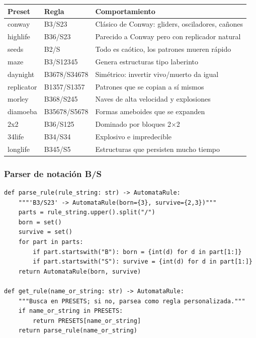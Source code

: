 \documentclass[12pt,a4paper]{article}
\begin{document}
\begin{table}[h]
\centering
\small
\begin{tabular}{llp{6cm}}
\toprule
\textbf{Preset} & \textbf{Regla} & \textbf{Comportamiento} \\
\midrule
conway     & B3/S23      & Clásico de Conway: gliders, osciladores, cañones \\
highlife   & B36/S23     & Parecido a Conway pero con replicador natural \\
seeds      & B2/S        & Todo es caótico, los patrones mueren rápido \\
maze       & B3/S12345   & Genera estructuras tipo laberinto \\
daynight   & B3678/S34678& Simétrico: invertir vivo/muerto da igual \\
replicator & B1357/S1357 & Patrones que se copian a sí mismos \\
morley     & B368/S245   & Naves de alta velocidad y explosiones \\
diamoeba   & B35678/S5678& Formas ameboides que se expanden \\
2x2        & B36/S125    & Dominado por bloques 2$\times$2 \\
34life     & B34/S34     & Explosivo e impredecible \\
longlife   & B345/S5     & Estructuras que persisten mucho tiempo \\
\bottomrule
\end{tabular}
\end{table}

\subsubsection{Parser de notación B/S}

\begin{lstlisting}
def parse_rule(rule_string: str) -> AutomataRule:
    """'B3/S23' -> AutomataRule(born={3}, survive={2,3})"""
    parts = rule_string.upper().split("/")
    born = set()
    survive = set()
    for part in parts:
        if part.startswith("B"): born = {int(d) for d in part[1:]}
        if part.startswith("S"): survive = {int(d) for d in part[1:]}
    return AutomataRule(born, survive)

def get_rule(name_or_string: str) -> AutomataRule:
    """Busca en PRESETS; si no, parsea como regla personalizada."""
    if name_or_string in PRESETS:
        return PRESETS[name_or_string]
    return parse_rule(name_or_string)
\end{lstlisting}
\end{document}
